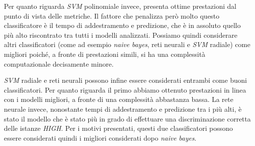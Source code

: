     Per quanto riguarda \textit{SVM} polinomiale invece, presenta ottime prestazioni dal punto di vista delle metriche. Il fattore che penalizza però molto questo classificatore è il tempo di addestramento e predizione, che è in assoluto quello più alto riscontrato tra tutti i modelli analizzati. Possiamo quindi considerare altri classificatori (come ad esempio \textit{naive bayes}, reti neurali e \textit{SVM} radiale) come migliori poiché, a fronte di prestazioni simili, si ha una complessità computazionale decisamente minore.
    
    \textit{SVM} radiale e reti neurali possono infine essere considerati entrambi come buoni classificatori. Per quanto riguarda il primo abbiamo ottenuto prestazioni in linea con i modelli migliori, a fronte di una complessità abbastanza bassa. La rete neurale invece, nonostante tempi di addestramento e predizione tra i più alti, è stato il modello che è stato più in grado di effettuare una discriminazione corretta delle istanze \textit{HIGH}. Per i motivi presentati, questi due classificatori possono essere considerati quindi i migliori considerati dopo \textit{naive bayes}.
    
    
    